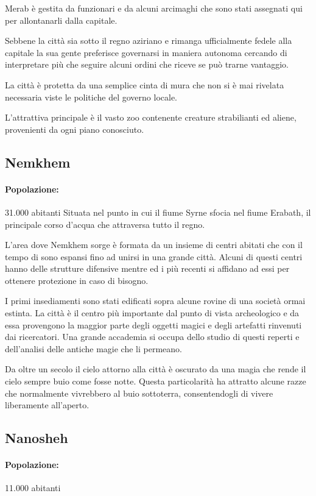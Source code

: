 \documentclass[letterpaper,twocolumn,openany,nodeprecatedcode]{dndbook}
\begin{document}
Merab è gestita da funzionari e da alcuni arcimaghi che sono stati assegnati qui per allontanarli dalla capitale.

Sebbene la città sia sotto il regno aziriano e rimanga ufficialmente fedele alla capitale la sua gente preferisce governarsi in maniera autonoma cercando di interpretare più che seguire alcuni ordini che riceve se può trarne vantaggio.

La città è protetta da una semplice cinta di mura che non si è mai rivelata necessaria viste le politiche del governo locale.

L'attrattiva principale è il vasto zoo contenente creature strabilianti ed aliene, provenienti da ogni piano conosciuto.

\subsection{Nemkhem}
\paragraph{Popolazione:} 31.000 abitanti
Situata nel punto in cui il fiume Syrne sfocia nel fiume Erabath, il principale corso d'acqua che attraversa tutto il regno.

L'area dove Nemkhem sorge è formata da un insieme di centri abitati che con il tempo di sono espansi fino ad unirsi in una grande città. Alcuni di questi centri hanno delle strutture difensive mentre ed i più recenti si affidano ad essi per ottenere protezione in caso di bisogno.

I primi insediamenti sono stati edificati sopra alcune rovine di una società ormai estinta. La città è il centro più importante dal punto di vista archeologico e da essa provengono la maggior parte degli oggetti magici e degli artefatti rinvenuti dai ricercatori. Una grande accademia si occupa dello studio di questi reperti e dell'analisi delle antiche magie che li permeano.

Da oltre un secolo il cielo attorno alla città è oscurato da una magia che rende il cielo sempre buio come fosse notte. Questa particolarità ha attratto alcune razze che normalmente vivrebbero al buio sottoterra, consentendogli di vivere liberamente all'aperto.

\subsection{Nanosheh}
\paragraph{Popolazione:} 11.000 abitanti
\end{document}
